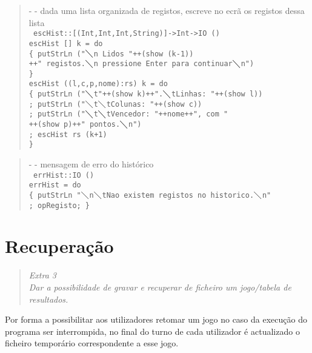 \documentclass[a4paper,titlepage]{scrreprt}
\begin{document}
	\begin{quote}
		{\small - - dada uma lista organizada de registos, escreve no ecrã os registos dessa lista\\}
		{\tt
		escHist::[(Int,Int,Int,String)]->Int->IO ()\\
		escHist [] k = do\\
		\{ putStrLn ("$\diagdown$n Lidos "++(show (k-1))\\
		++" registos.$\diagdown$n pressione Enter para continuar$\diagdown$n")\\
		\}\\
		escHist ((l,c,p,nome):rs) k = do\\
		\{ putStrLn ("$\diagdown$t"++(show k)++".$\diagdown$tLinhas: "++(show l))\\
		; putStrLn ("$\diagdown$t$\diagdown$tColunas: "++(show c))\\
		; putStrLn ("$\diagdown$t$\diagdown$tVencedor: "++nome++", com "\\
		++(show p)++" pontos.$\diagdown$n")\\
		; escHist rs (k+1)\\
		\}
		}
	\end{quote}
	\begin{quote}
		{\small - - mensagem de erro do histórico\\}
		{\tt
		errHist::IO ()\\
		errHist = do\\
		\{ putStrLn "$\diagdown$n$\diagdown$tNao existem registos no historico.$\diagdown$n"\\
		; opRegisto;
		\}
		}
	\end{quote}
\chapter{Recuperação}
	\begin{quote}
		\begin{center}
			{\it
			Extra 3\\
			Dar a possibilidade de gravar e recuperar de ficheiro um jogo/tabela de resultados.
			}
		\end{center}
	\end{quote}
Por forma a possibilitar aos utilizadores retomar um jogo no caso da execução do programa ser interrompida, no final do turno de cada utilizador
é actualizado o ficheiro temporário correspondente a esse jogo.
\end{document}
